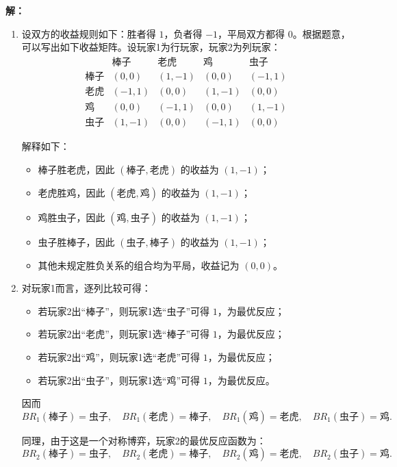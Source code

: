 \documentclass[12pt,a4paper]{article}
\begin{document}
\noindent\textbf{解：}
\begin{enumerate}[label=\alph*.]
  \item
  设双方的收益规则如下：胜者得 \(1\)，负者得 \(-1\)，平局双方都得 \(0\)。根据题意，可以写出如下收益矩阵。设玩家1为行玩家，玩家2为列玩家：
  \[
  \begin{array}{c|cccc}
   & \text{棒子} & \text{老虎} & \text{鸡} & \text{虫子}\\
  \hline
  \text{棒子} & (0,0) & (1,-1) & (0,0) & (-1,1)\\
  \text{老虎} & (-1,1) & (0,0) & (1,-1) & (0,0)\\
  \text{鸡} & (0,0) & (-1,1) & (0,0) & (1,-1)\\
  \text{虫子} & (1,-1) & (0,0) & (-1,1) & (0,0)
  \end{array}
  \]

  解释如下：
  \begin{itemize}
    \item 棒子胜老虎，因此 \((\text{棒子},\text{老虎})\) 的收益为 \((1,-1)\)；
    \item 老虎胜鸡，因此 \((\text{老虎},\text{鸡})\) 的收益为 \((1,-1)\)；
    \item 鸡胜虫子，因此 \((\text{鸡},\text{虫子})\) 的收益为 \((1,-1)\)；
    \item 虫子胜棒子，因此 \((\text{虫子},\text{棒子})\) 的收益为 \((1,-1)\)；
    \item 其他未规定胜负关系的组合均为平局，收益记为 \((0,0)\)。
  \end{itemize}

  \item
  对玩家1而言，逐列比较可得：
  \begin{itemize}
    \item 若玩家2出``棒子''，则玩家1选``虫子''可得 \(1\)，为最优反应；
    \item 若玩家2出``老虎''，则玩家1选``棒子''可得 \(1\)，为最优反应；
    \item 若玩家2出``鸡''，则玩家1选``老虎''可得 \(1\)，为最优反应；
    \item 若玩家2出``虫子''，则玩家1选``鸡''可得 \(1\)，为最优反应。
  \end{itemize}
  因而
  \[
  BR_1(\text{棒子})=\text{虫子},\quad
  BR_1(\text{老虎})=\text{棒子},\quad
  BR_1(\text{鸡})=\text{老虎},\quad
  BR_1(\text{虫子})=\text{鸡}.
  \]

  同理，由于这是一个对称博弈，玩家2的最优反应函数为：
  \[
  BR_2(\text{棒子})=\text{虫子},\quad
  BR_2(\text{老虎})=\text{棒子},\quad
  BR_2(\text{鸡})=\text{老虎},\quad
  BR_2(\text{虫子})=\text{鸡}.
  \]


\end{enumerate}
\end{document}

